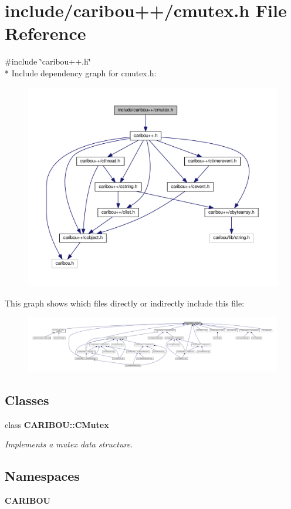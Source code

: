 \section{include/caribou++/cmutex.h File Reference}
\label{cmutex_8h}
{\ttfamily \#include \char`\"{}caribou++.\+h\char`\"{}}\\*
Include dependency graph for cmutex.\+h\+:
\nopagebreak
\begin{figure}[H]
\begin{center}
\leavevmode
\includegraphics[width=350pt]{cmutex_8h__incl}
\end{center}
\end{figure}
This graph shows which files directly or indirectly include this file\+:
\nopagebreak
\begin{figure}[H]
\begin{center}
\leavevmode
\includegraphics[width=350pt]{cmutex_8h__dep__incl}
\end{center}
\end{figure}
\subsection*{Classes}
\begin{DoxyCompactItemize}
\item 
class {\bf C\+A\+R\+I\+B\+O\+U\+::\+C\+Mutex}
\begin{DoxyCompactList}\small\item\em Implements a mutex data structure. \end{DoxyCompactList}\end{DoxyCompactItemize}
\subsection*{Namespaces}
\begin{DoxyCompactItemize}
\item 
 {\bf C\+A\+R\+I\+B\+OU}
\end{DoxyCompactItemize}
